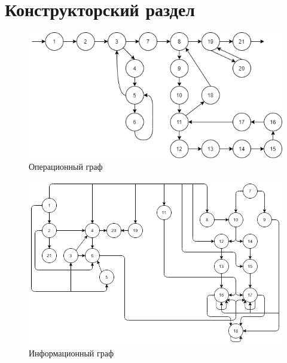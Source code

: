 \chapter{Конструкторский раздел}

\begin{figure}[h!]
	\begin{center}
		\includegraphics[scale=0.6]{assets/00.png}
	\end{center}
	\caption{Операционный граф}
\end{figure}

\begin{figure}[h!]
	\begin{center}
		\includegraphics[scale=0.6]{assets/01.png}
	\end{center}
	\caption{Информационный граф}
\end{figure}